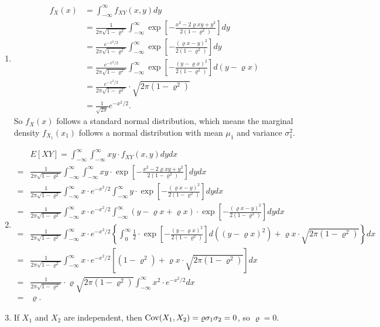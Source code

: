 \documentclass[11pt,a4paper]{article}
\begin{document}
\begin{enumerate}[label=\roman*)]
\item
\begin{align*}
f_X(x)&=\int_{-\infty}^\infty f_{XY}(x,y)dy\\
&=\frac{1}{2\pi\sqrt{1-\varrho^2}}\int_{-\infty}^\infty \exp\left[-\frac{x^2-2\varrho xy+y^2}{2(1-\varrho^2)}\right] dy\\
&=\frac{e^{-x^2/2}}{2\pi\sqrt{1-\varrho^2}}\int_{-\infty}^\infty \exp\left[-\frac{(\varrho x-y)^2}{2(1-\varrho^2)}\right] dy\\
&=\frac{e^{-x^2/2}}{2\pi\sqrt{1-\varrho^2}}\int_{-\infty}^\infty \exp\left[-\frac{(y-\varrho x)^2}{2(1-\varrho^2)}\right] d(y-\varrho x)\\
&=\frac{e^{-x^2/2}}{2\pi\sqrt{1-\varrho^2}}\cdot\sqrt{2\pi(1-\varrho^2)}\\
&=\frac{1}{\sqrt{2\pi}}e^{-x^2/2}.
\end{align*}
So $f_X(x)$ follows a standard normal distribution, which means the marginal density $f_{X_1}(x_1)$ follows a normal distribution with mean $\mu_1$ and variance $\sigma_1^2$.
\item
\begin{align*}
&E[XY]=\int_{-\infty}^\infty\int_{-\infty}^\infty xy\cdot f_{XY}(x,y) dydx\\
=&\frac{1}{2\pi\sqrt{1-\varrho^2}}\int_{-\infty}^\infty\int_{-\infty}^\infty xy\cdot\exp\left[-\frac{x^2-2\varrho xy+y^2}{2(1-\varrho^2)}\right] dy dx\\
=&\frac{1}{2\pi\sqrt{1-\varrho^2}}\int_{-\infty}^\infty x\cdot e^{-x^2/2} \int_{-\infty}^\infty y\cdot\exp\left[-\frac{(\varrho x-y)^2}{2(1-\varrho^2)}\right] dy dx\\
=&\frac{1}{2\pi\sqrt{1-\varrho^2}}\int_{-\infty}^\infty x\cdot e^{-x^2/2} \int_{-\infty}^\infty (y-\varrho x+\varrho x)\cdot\exp\left[-\frac{(\varrho x-y)^2}{2(1-\varrho^2)}\right] dy dx\\
=&\frac{1}{2\pi\sqrt{1-\varrho^2}}\int_{-\infty}^\infty x\cdot e^{-x^2/2} \left\{\int_0^\infty \frac{1}{2}\cdot\exp\left[-\frac{(y-\varrho x)^2}{2(1-\varrho^2)}\right] d((y-\varrho x)^2)+\varrho x\cdot\sqrt{2\pi(1-\varrho^2)}\right\} dx\\
=&\frac{1}{2\pi\sqrt{1-\varrho^2}}\int_{-\infty}^\infty x\cdot e^{-x^2/2} \left[(1-\varrho^2)+\varrho x\cdot\sqrt{2\pi(1-\varrho^2)}\right] dx\\
=&\frac{1}{2\pi\sqrt{1-\varrho^2}}\cdot\varrho\sqrt{2\pi(1-\varrho^2)}\int_{-\infty}^\infty x^2\cdot e^{-x^2/2} dx\\
=&\varrho.
\end{align*}
\item
If $X_1$ and $X_2$ are independent, then ${\rm Cov}(X_1,X_2)=\varrho\sigma_1\sigma_2=0$, so $\varrho=0$.


\end{enumerate}
\end{document}
